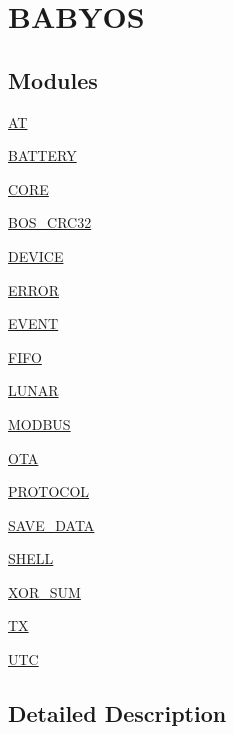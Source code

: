 \hypertarget{group___b_a_b_y_o_s}{}\section{B\+A\+B\+Y\+OS}
\label{group___b_a_b_y_o_s}
\subsection*{Modules}
\begin{DoxyCompactItemize}
\item 
\mbox{\hyperlink{group___a_t}{AT}}
\item 
\mbox{\hyperlink{group___b_a_t_t_e_r_y}{B\+A\+T\+T\+E\+RY}}
\item 
\mbox{\hyperlink{group___c_o_r_e}{C\+O\+RE}}
\item 
\mbox{\hyperlink{group___b_o_s___c_r_c32}{B\+O\+S\+\_\+\+C\+R\+C32}}
\item 
\mbox{\hyperlink{group___d_e_v_i_c_e}{D\+E\+V\+I\+CE}}
\item 
\mbox{\hyperlink{group___e_r_r_o_r}{E\+R\+R\+OR}}
\item 
\mbox{\hyperlink{group___e_v_e_n_t}{E\+V\+E\+NT}}
\item 
\mbox{\hyperlink{group___f_i_f_o}{F\+I\+FO}}
\item 
\mbox{\hyperlink{group___l_u_n_a_r}{L\+U\+N\+AR}}
\item 
\mbox{\hyperlink{group___m_o_d_b_u_s}{M\+O\+D\+B\+US}}
\item 
\mbox{\hyperlink{group___o_t_a}{O\+TA}}
\item 
\mbox{\hyperlink{group___p_r_o_t_o_c_o_l}{P\+R\+O\+T\+O\+C\+OL}}
\item 
\mbox{\hyperlink{group___s_a_v_e___d_a_t_a}{S\+A\+V\+E\+\_\+\+D\+A\+TA}}
\item 
\mbox{\hyperlink{group___s_h_e_l_l}{S\+H\+E\+LL}}
\item 
\mbox{\hyperlink{group___x_o_r___s_u_m}{X\+O\+R\+\_\+\+S\+UM}}
\item 
\mbox{\hyperlink{group___t_x}{TX}}
\item 
\mbox{\hyperlink{group___u_t_c}{U\+TC}}
\end{DoxyCompactItemize}


\subsection{Detailed Description}
